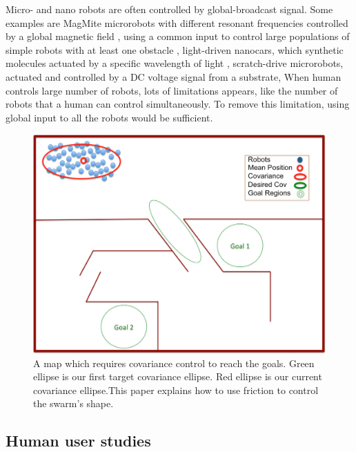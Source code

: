 \documentclass[letterpaper, 10 pt, conference]{ieeeconf}
\begin{document}
Micro- and nano robots are often controlled by global-broadcast signal. Some examples are MagMite microrobots with different resonant frequencies controlled by a global magnetic field \cite{Frutiger2008},
using a common input to control large populations of simple robots with at least one obstacle \cite{AaronManipulation2013}, light-driven nanocars, which synthetic molecules actuated by a specific wavelength of light \cite{TourNanocar2012}, scratch-drive microrobots, actuated and controlled by a DC voltage signal from a substrate\cite{Donald2006,Donald2008}, When human controls large number of robots, lots of limitations appears, like the number of robots that a human can control simultaneously. To remove this limitation, using global input to all the robots would be sufficient. 
\begin{figure}[h]
\begin{center}
\includegraphics[width=\columnwidth]{HardMap.png}
\caption{A map which requires covariance control to reach the goals. Green ellipse is our first target covariance ellipse. Red ellipse is our current covariance ellipse.This paper explains how to use friction to control the swarm's shape.}
\label{fig:covariance}
\end{center}
\end{figure} 
\subsection{Human user studies}
\end{document}
